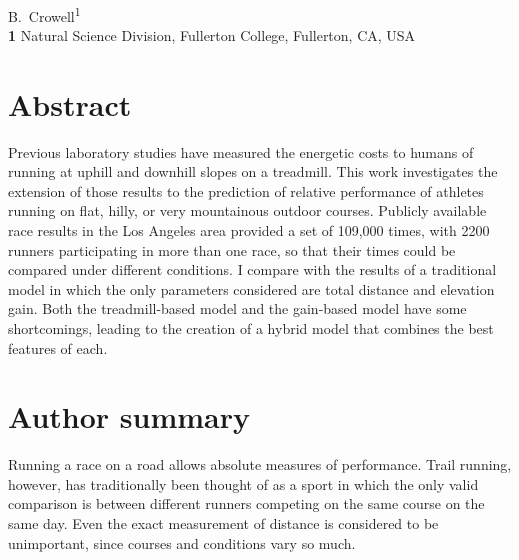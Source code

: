 \documentclass[10pt,letterpaper]{article}
\begin{document}
\vspace*{0.2in}

\begin{flushleft}
{\Large
\textbf{} 
}
\newline
\\
B.~Crowell\textsuperscript{1}
\\
\bigskip
\textbf{1} Natural Science Division, Fullerton College, Fullerton, CA, USA\\
\bigskip

\end{flushleft}

\linenumbers

\section*{Abstract}

Previous laboratory studies have measured the energetic costs to humans of running at
uphill and downhill slopes on a treadmill. This work investigates the extension
of those results to the prediction of relative performance of athletes running
on flat, hilly, or very mountainous outdoor courses.
Publicly available race results in the Los Angeles area provided a set of
109,000 times, with 2200 runners participating in more than one race, so that
their times could be compared under different conditions.
I compare with the results of
a traditional model in which the only parameters considered are total distance
and elevation gain. Both the treadmill-based model and the gain-based model
have some shortcomings, leading to the creation of a hybrid model that combines
the best features of each.


\section*{Author summary}
Running a race on a road allows absolute measures of performance. Trail running, however, has traditionally
been thought of as a sport in which the only valid comparison is between
different runners competing on the same course on the same day. Even the
exact measurement of distance is considered to be unimportant, since courses
and conditions vary so much. 
\end{document}
